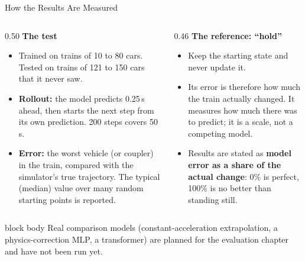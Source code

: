 \documentclass[aspectratio=169,11pt]{beamer}
\begin{document}
\begin{frame}{How the Results Are Measured}
  \vspace{0.2em}
  \begin{columns}[T,onlytextwidth]
    \begin{column}{0.50\textwidth}
      {\small\textbf{The test}}
      \begin{itemize}\setlength\itemsep{0.3em}
        \footnotesize
        \item Trained on trains of 10 to 80 cars. Tested on trains of 121 to
              150 cars that it never saw.
        \item \textbf{Rollout:} the model predicts 0.25\,s ahead, then starts
              the next step from its own prediction. 200 steps covers 50\,s.
        \item \textbf{Error:} the worst vehicle (or coupler) in the train,
              compared with the simulator's true trajectory. The typical
              (median) value over many random starting points is reported.
      \end{itemize}
    \end{column}
    \begin{column}{0.46\textwidth}
      {\small\textbf{The reference: ``hold''}}
      \begin{itemize}\setlength\itemsep{0.3em}
        \footnotesize
        \item Keep the starting state and never update it.
        \item Its error is therefore \alert{how much the train actually
              changed}. It measures how much there was to predict; it is a
              scale, not a competing model.
        \item Results are stated as \textbf{model error as a share of the
              actual change}: 0\% is perfect, 100\% is no better than
              standing still.
      \end{itemize}
    \end{column}
  \end{columns}

  \vspace{0.8em}
  \begin{beamercolorbox}[wd=\textwidth,sep=6pt]{block body}
    \footnotesize Real comparison models (constant-acceleration extrapolation,
    a physics-correction MLP, a transformer) are planned for the evaluation
    chapter and have not been run yet.
  \end{beamercolorbox}
\end{frame}
\end{document}
